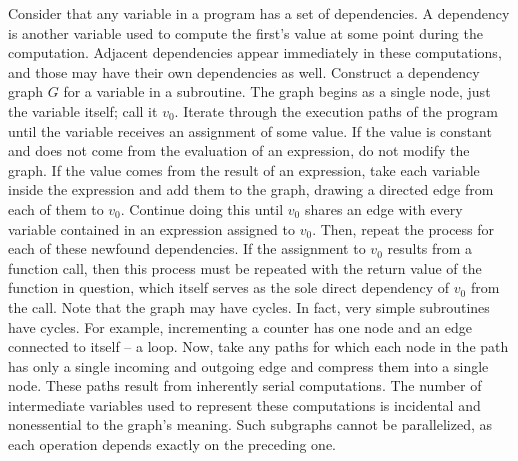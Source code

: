 \documentclass[pageno]{jpaper}
\begin{document}
Consider that any variable in a program has a set of dependencies. A dependency
is another variable used to compute the first's value at some point during the
computation. Adjacent dependencies appear immediately in these computations, and
those may have their own dependencies as well. Construct a dependency graph $G$
for a variable in a subroutine. The graph begins as a single node, just the
variable itself; call it $v_0$. Iterate through the execution paths of the
program until the variable receives an assignment of some value. If the value is
constant and does not come from the evaluation of an expression, do not modify
the graph. If the value comes from the result of an expression, take each
variable inside the expression and add them to the graph, drawing a directed
edge from each of them to $v_0$. Continue doing this until $v_0$ shares an edge
with every variable contained in an expression assigned to $v_0$. Then, repeat
the process for each of these newfound dependencies. If the assignment to $v_0$
results from a function call, then this process must be repeated with the return
value of the function in question, which itself serves as the sole direct
dependency of $v_0$ from the call. Note that the graph may have cycles. In fact,
very simple subroutines have cycles. For example, incrementing a counter has one
node and an edge connected to itself -- a loop. Now, take any paths for which
each node in the path has only a single incoming and outgoing edge and compress
them into a single node. These paths result from inherently serial computations.
The number of intermediate variables used to represent these computations is
incidental and nonessential to the graph's meaning. Such subgraphs cannot be
parallelized, as each operation depends exactly on the preceding one. 
\end{document}
